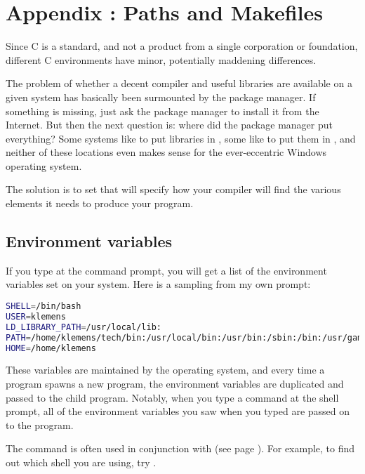 \renewcommand\thechapter{\Alph{chapter}}
\setcounter{chapter}{1}
\setcounter{section}{0}
\setcounter{subsection}{0}
\setcounter{ex}{0}
\setcounter{lstlisting}{0}
\setcounter{figure}{0}
\chapter{Appendix \thechapter: Paths and Makefiles}

Since C is a standard, and not a product from a single corporation
or foundation, different C environments have minor, potentially maddening
differences. 

The problem of whether a decent compiler and useful libraries 
are available on a given system has basically been surmounted by the
package manager. If something is missing, just ask the package manager
to install it from the Internet.
But then the next question is: where did the package manager put
everything? Some systems like to put libraries in , some like
to put them in , and neither of these locations even makes
sense for the ever-eccentric Windows operating system.

The solution is to set  that will specify
how your compiler will find the various elements it needs to produce
your program.

\section{Environment variables} If you type  at the command
prompt, you will get a list of the environment variables set on your
system. Here is a sampling from my own prompt: 
\begin{lstlisting}[language=sh]
SHELL=/bin/bash
USER=klemens
LD_LIBRARY_PATH=/usr/local/lib:
PATH=/home/klemens/tech/bin:/usr/local/bin:/usr/bin:/sbin:/bin:/usr/games:/sbin
HOME=/home/klemens
\end{lstlisting}

These variables are maintained by the operating system, and every time
a program spawns a new program, the environment variables are duplicated
and passed to the child program.  Notably, when you type a command at the
shell prompt, all of the environment variables you saw when you typed
 are passed on to the program.

The  command is often used in conjunction with  (see
page \pageref{grep}). For example, to find out which shell you are using,
try .


